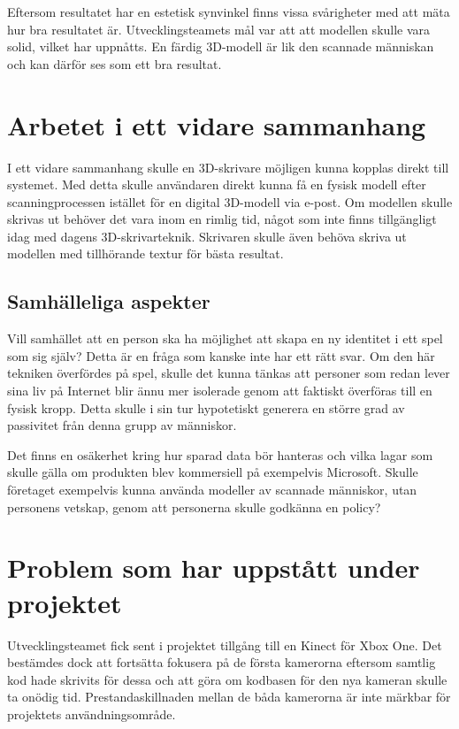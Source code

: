 \documentclass[a4paper,12pt,oneside,final]{extbook}
\begin{document}
Eftersom resultatet har en estetisk synvinkel finns vissa svårigheter med att mäta hur bra resultatet är. Utvecklingsteamets mål var att att modellen skulle vara solid, vilket har uppnåtts. En färdig 3D-modell är lik den scannade människan och kan därför ses som ett bra resultat.

\section{Arbetet i ett vidare sammanhang}
I ett vidare sammanhang skulle en 3D-skrivare möjligen kunna kopplas direkt till systemet. Med detta skulle användaren direkt kunna få en fysisk modell efter scanningprocessen istället för en digital 3D-modell via e-post. Om modellen skulle skrivas ut behöver det vara inom en rimlig tid, något som inte finns tillgängligt idag med dagens 3D-skrivarteknik. Skrivaren skulle även behöva skriva ut modellen med tillhörande textur för bästa resultat.

\subsection{Samhälleliga aspekter}
Vill samhället att en person ska ha möjlighet att skapa en ny identitet i ett spel som sig själv? Detta är en fråga som kanske inte har ett rätt svar. Om den här tekniken överfördes på spel, skulle det kunna tänkas att personer som redan lever sina liv på Internet blir ännu mer isolerade genom att faktiskt överföras till en fysisk kropp. Detta skulle i sin tur hypotetiskt generera en större grad av passivitet från denna grupp av människor.

Det finns en osäkerhet kring hur sparad data bör hanteras och vilka lagar som skulle gälla om produkten blev kommersiell på exempelvis Microsoft.
Skulle företaget exempelvis kunna använda modeller av scannade människor, utan personens vetskap, genom att personerna skulle godkänna en policy?

\section {Problem som har uppstått under projektet}
Utvecklingsteamet fick sent i projektet tillgång till en Kinect för Xbox One. Det bestämdes dock att fortsätta fokusera på de första kamerorna eftersom samtlig kod hade skrivits för dessa och att göra om kodbasen för den nya kameran skulle ta onödig tid. Prestandaskillnaden mellan de båda kamerorna är inte märkbar för projektets användningsområde.
\end{document}

